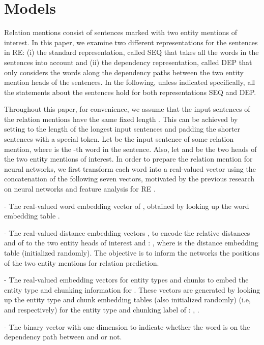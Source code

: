 \documentclass[11pt,letterpaper]{article}
\begin{document}
\section{Models}



Relation mentions consist of sentences marked with two entity mentions of interest. In this paper, we examine two different representations for the sentences in RE: (i) the standard representation, called SEQ that takes all the words in the sentences into account and (ii) the dependency representation, called DEP that only considers the words along the dependency paths between the two entity mention heads of the sentences. In the following, unless indicated specifically, all the statements about the sentences hold for both representations SEQ and DEP.



Throughout this paper, for convenience, we assume that the input sentences of the relation mentions have the same fixed length . This can be achieved by setting  to the length of the longest input sentences and padding the shorter sentences with a special token. Let  be the input sentence of some relation mention, where  is the -th word in the sentence. Also, let  and  be the two heads of the two entity mentions of interest. In order to prepare the relation mention for neural networks, we first transform each word  into a real-valued vector  using the concatenation of the following seven vectors, motivated by the previous research on neural networks and feature analysis for RE \cite{Zhou:05,Sun:11,Gormley:15}.

- The real-valued word embedding vector  of , obtained by  looking up the word embedding table .




- The real-valued distance embedding vectors ,  to encode the relative distances  and  of  to the two entity heads of interest  and : ,  where  is the distance embedding table (initialized randomly). The objective is to inform the networks the positions of the two entity mentions for relation prediction.

- The real-valued embedding vectors for entity types  and chunks  to embed the entity type and chunking information for . These vectors are generated by looking up the entity type and chunk embedding tables (also initialized randomly) (i.e,  and  respectively) for the entity type  and chunking label  of : , .



- The binary vector  with one dimension to indicate whether the word  is on the dependency path between  and  or not.
\end{document}
